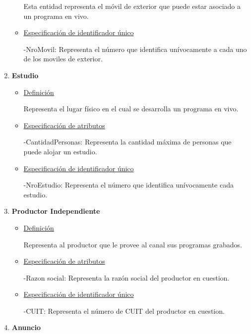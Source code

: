 \documentclass[a4paper,10pt,titlepage]{article}
\begin{document}
\begin{enumerate}
\begin{itemize}
Esta entidad representa el m\'ovil de exterior que puede estar asociado a un programa en vivo.

\item \underline{Especificaci\'on de identificador \'unico}

-NroMovil: Representa el n\'umero que identifica un\'ivocamente a cada uno de los moviles de exterior.

\end{itemize}

\item {\bf Estudio}

\begin{itemize}

\item \underline{Definici\'on}

Representa el lugar f\'isico en el cual se desarrolla un programa en vivo.

\item \underline{Especificaci\'on de atributos}

-CantidadPersonas: Representa la cantidad m\'axima de personas que puede alojar un estudio.

\item \underline{Especificaci\'on de identificador \'unico}

-NroEstudio: Representa el n\'umero que identifica un\'ivocamente cada estudio.

\end{itemize}


\item {\bf Productor Independiente}

\begin{itemize}

\item \underline{Definici\'on}

Representa al productor que le provee al canal sus programas grabados.

\item \underline{Especificaci\'on de atributos}

-Razon social: Representa la raz\'on social del productor en cuestion.

\item \underline{Especificaci\'on de identificador \'unico}

-CUIT: Representa el n\'umero de CUIT del productor en cuestion.

\end{itemize}


\item {\bf Anuncio}


\end{enumerate}
\end{document}
